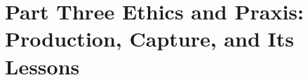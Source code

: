 \part*{\textcolor{rosedeep}{Part Three \quad Ethics and Praxis: Production, Capture, and Its Lessons}}


